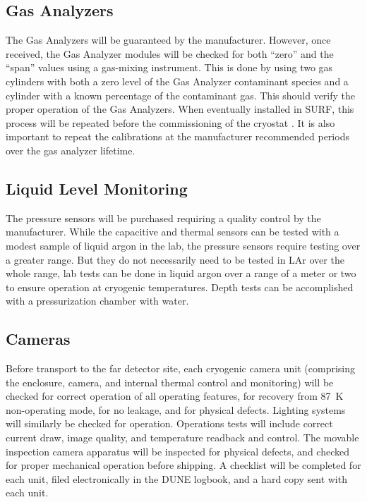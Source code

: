 \subsection{Gas Analyzers}
\label{sec:fdgen-slow-cryo-qc-ga}

The Gas Analyzers will be guaranteed by the manufacturer. However, once received, the Gas Analyzer modules will be checked for both ``zero'' and the ``span'' values using a gas-mixing instrument. This is done by using two gas cylinders with both a zero level of the Gas Analyzer contaminant species and a cylinder with a known percentage of the contaminant gas. This should verify the proper operation of the Gas Analyzers. When eventually installed in SURF, this process will be repeated before the commissioning of the cryostat . It is also important to repeat the calibrations at the manufacturer recommended periods over the gas analyzer lifetime.
 

\subsection{Liquid Level Monitoring}
\label{sec:fdgen-slow-cryo-qc-llm}

The pressure sensors will be purchased requiring a quality control by the manufacturer.
While the capacitive and thermal sensors can be tested with a modest sample of liquid argon in the lab,
the pressure sensors require testing over a greater range.  But they do not
necessarily need to be tested in LAr over the whole range,  lab tests
can be done in liquid argon over a range of a meter or two to ensure operation
at cryogenic temperatures.  Depth tests can be accomplished with a
pressurization chamber with water.


\subsection{Cameras}
\label{sec:fdgen-slow-cryo-qc-c}

Before transport to the far detector site, each cryogenic camera unit (comprising the enclosure, camera, and internal thermal control and monitoring) will be checked for correct operation of all operating features, for recovery from \SI{87}{K} non-operating mode, for no leakage, and for physical defects. Lighting systems will similarly be checked for operation. Operations tests will include correct current draw, image quality, and temperature readback and control. The movable inspection camera apparatus will be inspected for physical defects, and checked for proper mechanical operation before shipping. A checklist will be completed for each unit, filed electronically in the DUNE logbook, and a hard copy sent with each unit. 

